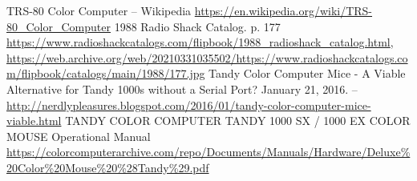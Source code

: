 \documentclass[11pt, a4paper]{article}
\begin{document}
\begin{thebibliography}{9}
 TRS-80 Color Computer -- Wikipedia \url{https://en.wikipedia.org/wiki/TRS-80_Color_Computer}
 1988 Radio Shack Catalog. p. 177 \url{https://www.radioshackcatalogs.com/flipbook/1988_radioshack_catalog.html}, \url{https://web.archive.org/web/20210331035502/https://www.radioshackcatalogs.com/flipbook/catalogs/main/1988/177.jpg}
 Tandy Color Computer Mice - A Viable Alternative for Tandy 1000s without a Serial Port? January 21, 2016. -- \url{http://nerdlypleasures.blogspot.com/2016/01/tandy-color-computer-mice-viable.html}
 TANDY  COLOR COMPUTER TANDY 1000 SX / 1000 EX COLOR MOUSE Operational Manual \url{https://colorcomputerarchive.com/repo/Documents/Manuals/Hardware/Deluxe%20Color%20Mouse%20%28Tandy%29.pdf}
\end{thebibliography}
\end{document}

